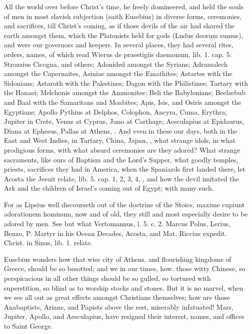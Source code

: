 {All the world over before Christ's time, he freely domineered, and held
the souls of men in most slavish subjection (saith Eusebius) in
diverse forms, ceremonies, and sacrifices, till Christ's coming, as if
those devils of the air had shared the earth amongst them, which the
Platonists held for gods (Ludus deorum sumus), and were our
governors and keepers. In several places, they had several rites,
orders, names, of which read Wierus de praestigiis daemonum, lib. 1.
cap. 5. Strozzius Cicogna, and others; Adonided amongst the
Syrians; Adramalech amongst the Capernaites, Asiniae amongst the
Emathites; Astartes with the Sidonians; Astaroth with the Palestines;
Dagon with the Philistines; Tartary with the Hanaei; Melchonis amongst
the Ammonites: Beli the Babylonians; Beelzebub and Baal with the
Samaritans and Moabites; Apis, Isis, and Osiris amongst the Egyptians;
Apollo Pythius at Delphos, Colophon, Ancyra, Cuma, Erythra; Jupiter in
Crete, Venus at Cyprus, Juno at Carthage, Aesculapius at Epidaurus,
Diana at Ephesus, Pallas at Athens, \etc{}. And even in these our days,
both in the East and West Indies, in Tartary, China, Japan, \etc{}, what
strange idols, in what prodigious forms, with what absurd ceremonies
are they adored? What strange sacraments, like ours of Baptism and the
Lord's Supper, what goodly temples, priests, sacrifices they had in
America, when the Spaniards first landed there, let Acosta the Jesuit
relate, lib. 5. cap. 1, 2, 3, 4, \etc{}, and how the devil imitated the
Ark and the children of Israel's coming out of Egypt; with many such.

For as Lipsius well discourseth out of the doctrine of the Stoics,
maxime cupiunt adorationem hominum, now and of old, they still and most
especially desire to be adored by men. See but what Vertomannus, l. 5.
c. 2. Marcus Polus, Lerius, Benzo, P. Martyr in his Ocean Decades,
Acosta, and Mat. Riccius expedit. Christ. in Sinus, lib. 1. relate.

Eusebius wonders how that wise city of Athens, and flourishing
kingdoms of Greece, should be so besotted; and we in our times, how.
those witty Chinese, so perspicacious in all other things should be so
gulled, so tortured with superstition, so blind as to worship stocks
and stones. But it is no marvel, when we see all out as great effects
amongst Christians themselves; how are those Anabaptists, Arians, and
Papists above the rest, miserably infatuated! Mars, Jupiter, Apollo,
and Aesculapius, have resigned their interest, names, and offices to
Saint George.

}
